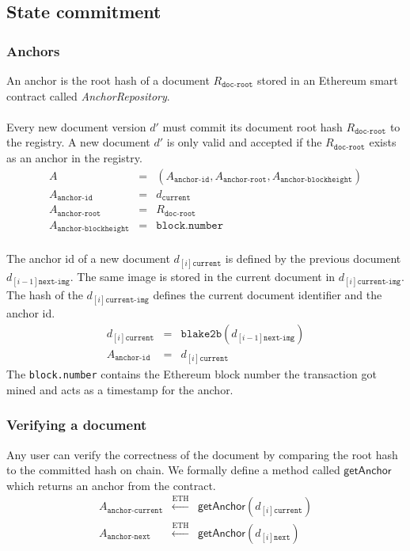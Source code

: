 \subsection{State commitment}

\subsubsection{Anchors}
An anchor is the root hash of a document $R_{\texttt{doc-root}}$ stored in an Ethereum smart contract called \textit{AnchorRepository}. 
\\\\
Every new document version $d'$ must commit its  document root hash $R_{\texttt{doc-root}}$ to the registry. A new document $d'$ is only valid and accepted if the $R_{\texttt{doc-root}}$ exists as an anchor in the registry.\\
\begin{eqnarray}
A &=& (A_{\texttt{anchor-id}}, A_{\texttt{anchor-root}}, A_{\texttt{anchor-blockheight}})\\
A_{\texttt{anchor-id}} & = & d_{\texttt{current}} \\
A_{\texttt{anchor-root}} & = & R_{\texttt{doc-root}} \\
A_{\texttt{anchor-blockheight}} & = & \texttt{block.number}
\end{eqnarray}
\\
The anchor id of a new document $d_{[i]{\texttt{current}}}$ is defined by the previous document $d_{[i-1]\texttt{next-img}}$. The same image is stored in the current 
document in $d_{[i]\texttt{current-img}}$. The hash of the $d_{[i]\texttt{current-img}}$ defines the current document identifier and the anchor id.
\begin{eqnarray}
d_{[i]\texttt{current}}& = & \mathtt{blake2b}(d_{[i-1]\texttt{next-img}})\\
A_{\texttt{anchor-id}}& = & d_{[i]\texttt{current}}
\end{eqnarray}
The \texttt{block.number} contains the Ethereum block number the transaction got mined and acts as a timestamp for the anchor.
\subsubsection{Verifying a document}
Any user can verify the correctness of the document by comparing the root hash to the committed hash on chain. We formally define a method called $\mathsf{getAnchor}$ which returns an anchor from the contract.
\begin{eqnarray}
A_{\texttt{anchor-current}} & \xleftarrow[]{\text{ETH}}& \mathsf{getAnchor}(d_{[i]{\texttt{current}}}) \\
A_{\texttt{anchor-next}} & \xleftarrow[]{\text{ETH}} & \mathsf{getAnchor}(d_{[i]{\texttt{next}}}) \\
\end{eqnarray}

